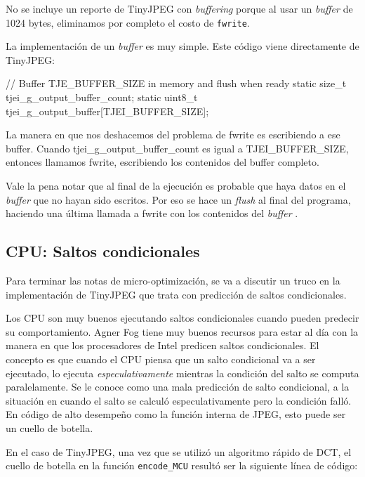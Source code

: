 {No se incluye un reporte de TinyJPEG con \emph{buffering} porque al usar un
\emph{ buffer } de 1024 bytes, eliminamos por completo el costo de \verb+fwrite+.

La implementación de un \emph{ buffer } es muy simple. Este código viene directamente de TinyJPEG:

\begin{code}[language=C][h]
    // Buffer TJE_BUFFER_SIZE in memory and flush when ready
    static size_t tjei_g_output_buffer_count;
    static uint8_t tjei_g_output_buffer[TJEI_BUFFER_SIZE];
\end{code}

La manera en que nos deshacemos del problema de fwrite es escribiendo a ese
buffer.  Cuando tjei\_g\_output\_buffer\_count es igual a TJEI\_BUFFER\_SIZE,
entonces llamamos fwrite, escribiendo los contenidos del buffer completo.

Vale la pena notar que al final de la ejecución es probable que haya datos en
el \emph{ buffer } que no hayan sido escritos. Por eso se hace un \emph{flush} al final
del programa, haciendo una última llamada a fwrite con los contenidos del
\emph{ buffer }.

\subsection{CPU: Saltos condicionales}\label{sub:cpu-branch}

Para terminar las notas de micro-optimización, se va a discutir un truco en la
implementación de TinyJPEG que trata con predicción de saltos condicionales.

Los CPU son muy buenos ejecutando saltos condicionales cuando pueden predecir
su comportamiento. Agner Fog \cite{agner} tiene muy buenos recursos para estar
al día con la manera en que los procesadores de Intel predicen saltos
condicionales. El concepto es que cuando el CPU piensa que un salto condicional
va a ser ejecutado, lo ejecuta \emph{ especulativamente } mientras la condición
del salto se computa paralelamente. Se le conoce como una mala predicción de
salto condicional, a la situación en cuando el salto se calculó
especulativamente pero la condición falló. En código de alto desempeño como la
función interna de JPEG, esto puede ser un cuello de botella.

En el caso de TinyJPEG, una vez que se utilizó un algoritmo rápido de DCT, el
cuello de botella en la función \verb+encode_MCU+ resultó ser la siguiente
línea de código:

}
